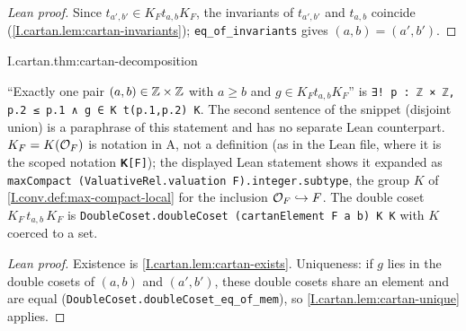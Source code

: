 \begin{proof}[Lean proof]
Since $t_{a',b'}\in K_Ft_{a,b}K_F$, the invariants of $t_{a',b'}$ and $t_{a,b}$ coincide (\cref{I.cartan.lem:cartan-invariants}); \texttt{eq\_of\_invariants} gives $(a,b)=(a',b')$.
\end{proof}

\begin{theorem}
\end{theorem}
\begin{tfformal}{I.cartan.thm:cartan-decomposition}
\begin{tffidelity}
``Exactly one pair $(a,b)\in\mathbb{Z}\times\mathbb{Z}$ with $a\ge b$ and $g\in K_Ft_{a,b}K_F$'' is \texttt{∃! p : ℤ × ℤ, p.2 ≤ p.1 ∧ g ∈ K t(p.1,p.2) K}. The second sentence of the snippet (disjoint union) is a paraphrase of this statement and has no separate Lean counterpart. $K_F=K(\mathcal{O}_F)$ is notation in A, not a definition (as in the Lean file, where it is the scoped notation \texttt{𝐊[F]}); the displayed Lean statement shows it expanded as \texttt{maxCompact (ValuativeRel.valuation F).integer.subtype}, the group $K$ of \cref{I.conv.def:max-compact-local} for the inclusion $\mathcal{O}_F\hookrightarrow F$. The double coset $K_F\,t_{a,b}\,K_F$ is \texttt{DoubleCoset.doubleCoset (cartanElement F a b) K K} with $K$ coerced to a set.
\end{tffidelity}
\end{tfformal}
\begin{proof}[Lean proof]
Existence is \cref{I.cartan.lem:cartan-exists}. Uniqueness: if $g$ lies in the double cosets of $(a,b)$ and $(a',b')$, these double cosets share an element and are equal (\texttt{DoubleCoset.doubleCoset\_eq\_of\_mem}), so \cref{I.cartan.lem:cartan-unique} applies.
\end{proof}

